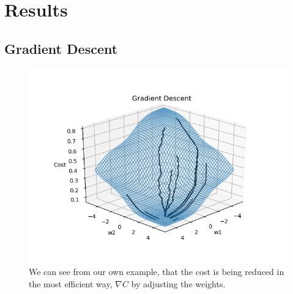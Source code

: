 

\section{Results}
\label{results}
\subsection{Gradient Descent}
\label{resgd}
\begin{figure}[H]
\centering
\includegraphics[width=14cm]{images/gradientdescent2.png}
\caption{We can see from our own example, that the cost is being reduced in the most efficient way, $\nabla C$ by adjusting the weights.}
\end{figure}

